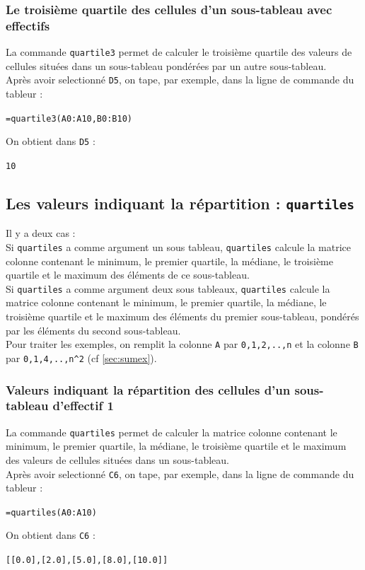 \documentclass[a4paper,11pt]{book}
\begin{document}
\subsubsection{Le troisi\`eme quartile des cellules d'un sous-tableau avec effectifs}
La commande {\tt quartile3} permet de calculer le troisi\`eme quartile
des valeurs de cellules situ\'ees dans un sous-tableau pond\'er\'ees par un 
autre sous-tableau.\\ 
Apr\`es avoir selectionn\'e {\tt D5}, on tape, par exemple, dans la ligne de 
commande du tableur :
\begin{center}{\tt =quartile3(A0:A10,B0:B10)}\end{center}
On obtient dans {\tt D5} :
\begin{center}{\tt 10}\end{center}
 
\subsection{Les valeurs indiquant la r\'epartition : {\tt quartiles}}
Il y a deux cas :\\
Si {\tt quartiles} a comme argument un sous tableau, {\tt quartiles} calcule 
 la matrice colonne contenant le minimum, le premier quartile, la m\'ediane, 
le troisi\`eme quartile et le maximum  des \'el\'ements de ce sous-tableau.\\
Si {\tt quartiles} a comme argument deux sous tableaux, {\tt quartiles} calcule
 la matrice colonne contenant le minimum, le premier quartile, la m\'ediane, 
le troisi\`eme quartile et le maximum des \'el\'ements du premier sous-tableau,
 pond\'er\'es par les \'el\'ements du second sous-tableau.\\ 
Pour traiter les exemples,  on remplit la colonne {\tt A} par 
{\tt 0,1,2,..,n} et la colonne 
{\tt B} par {\tt 0,1,4,..,n\verb|^|2} (cf \ref{sec:sumex}).
 
\subsubsection{Valeurs indiquant la r\'epartition  des cellules d'un sous-tableau d'effectif 1}
La commande {\tt quartiles} permet de calculer la matrice colonne contenant
le minimum, le premier quartile, la m\'ediane, le troisi\`eme quartile et 
le maximum des valeurs de cellules situ\'ees dans un sous-tableau.\\  
Apr\`es avoir selectionn\'e {\tt C6}, on tape, par exemple, dans la ligne de 
commande du tableur :
\begin{center}{\tt =quartiles(A0:A10)}\end{center}
On obtient dans {\tt C6} :
\begin{center}{\tt [[0.0],[2.0],[5.0],[8.0],[10.0]]}\end{center} 
\end{document}

